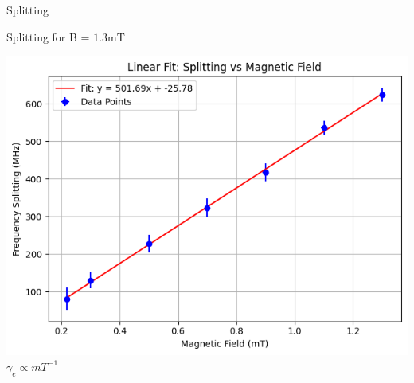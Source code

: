 \documentclass{beamer}
\begin{document}
\begin{frame}{Splitting}
\begin{minipage}{0.48\textwidth}
        {\small Splitting for B = $1.3$mT}
    \end{minipage}
    \hfill
    \begin{minipage}{0.48\textwidth}
        \centering
        \includegraphics[width=\linewidth]{presentation/figs/split_vs_field.png}
        {\small $\gamma_e \propto mT^{-1}$}
    \end{minipage}
\end{frame}
\end{document}
